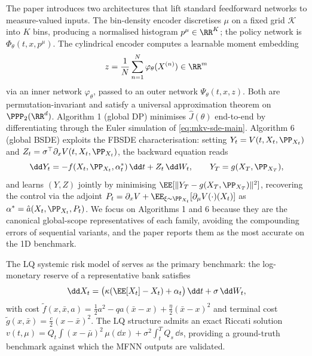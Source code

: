 \documentclass[11pt]{article}
\begin{document}
The paper introduces two architectures that lift standard feedforward networks to measure-valued inputs. The bin-density encoder discretises $\mu$ on a fixed grid $\mathcal{K}$ into $K$ bins, producing a normalised histogram $p^\mu \in \RR^K$; the policy network is $\Phi_\theta(t, x, p^\mu)$. The cylindrical encoder computes a learnable moment embedding
\begin{equation}\label{eq:cylindrical-main}
  z = \frac{1}{N}\sum_{n=1}^N \varphi_\theta(X^{(n)}) \in \RR^m
\end{equation}
via an inner network $\varphi_\theta$, passed to an outer network $\Psi_\theta(t, x, z)$. Both are permutation-invariant and satisfy a universal approximation theorem on $\PPP_2(\RR^d)$. Algorithm 1 (global DP) minimises $\hat{J}(\theta)$ end-to-end by differentiating through the Euler simulation of \eqref{eq:mkv-sde-main}. Algorithm 6 (global BSDE) exploits the FBSDE characterisation: setting $Y_t = V(t, X_t, \PP_{X_t})$ and $Z_t = \sigma^\top \partial_x V(t, X_t, \PP_{X_t})$, the backward equation reads
\begin{equation}\label{eq:bsde-main}
  \dd Y_t = -f(X_t, \PP_{X_t}, \alpha^*_t)\,\dd t + Z_t\,\dd W_t, \qquad Y_T = g(X_T, \PP_{X_T}),
\end{equation}
and learns $(Y, Z)$ jointly by minimising $\EE[\|Y_T - g(X_T, \PP_{X_T})\|^2]$, recovering the control via the adjoint $P_t = \partial_x V + \EE_{\xi \sim \PP_{X_t}}[\partial_\mu V(\cdot)(X_t)]$ as $\alpha^* = \hat{a}(X_t, \PP_{X_t}, P_t)$. We focus on Algorithms 1 and 6 because they are the canonical global-scope representatives of each family, avoiding the compounding errors of sequential variants, and the paper reports them as the most accurate on the 1D benchmark.

The LQ systemic risk model of \citet{carmona2015systemic} serves as the primary benchmark: the log-monetary reserve of a representative bank satisfies
\begin{equation}\label{eq:systemic-main}
  \dd X_t = \bigl(\kappa(\EE[X_t] - X_t) + \alpha_t\bigr)\,\dd t + \sigma\,\dd W_t,
\end{equation}
with cost $\tilde{f}(x,\bar x, a) = \tfrac{1}{2}a^2 - qa(\bar x - x) + \tfrac{\eta}{2}(\bar x - x)^2$ and terminal cost $\tilde{g}(x,\bar x) = \tfrac{c}{2}(x - \bar x)^2$. The LQ structure admits an exact Riccati solution $v(t,\mu) = Q_t \int(x-\bar\mu)^2\,\mu(\dd x) + \sigma^2\int_t^T Q_s\,\dd s$, providing a ground-truth benchmark against which the MFNN outputs are validated.
\end{document}
